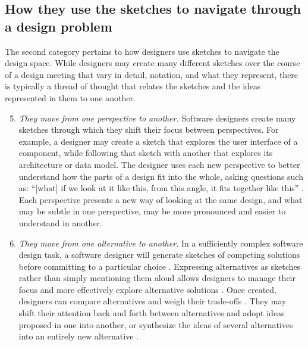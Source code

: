 \subsection{How they use the sketches to navigate through a design problem}

The second category pertains to how designers use sketches to navigate the design space. While designers may create many different sketches over the course of a design meeting that vary in detail, notation, and what they represent, there is typically a thread of thought that relates the sketches and the ideas represented in them to one another. 

\begin{enumerate}
  \setcounter{enumi}{4}
  \item \emph{They move from one perspective to another.} Software designers create many sketches through which they shift their focus between perspectives. For example, a designer may create a sketch that explores the user interface of a component, while following that sketch with another that explores its architecture or data model. The designer uses each new perspective to better understand how the parts of a design fit into the whole, asking questions such as: ``[what] if we look at it like this, from this angle, it fits together like this'' \cite{petre2009insights}. Each perspective presents a new way of looking at the same design, and what may be subtle in one perspective, may be more pronounced and easier to understand in another. 

 \item \emph{They move from one alternative to another.} In a sufficiently complex software design task, a software designer will generate sketches of competing solutions before committing to a particular choice \cite{zannier2007comparing}. Expressing alternatives as sketches rather than simply mentioning them aloud allows designers to manage their focus and more effectively explore alternative solutions \cite{myers2008designers}. Once created, designers can compare alternatives and weigh their trade-offs \cite{buxton2010sketching}. They may shift their attention back and forth between alternatives and adopt ideas proposed in one into another, or synthesize the ideas of several alternatives into an entirely new alternative \cite{jones1992design}. 


\end{enumerate}
